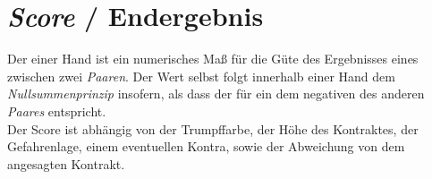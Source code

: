 \section{\textit{Score} / Endergebnis}

\noindent
Der \scy einer Hand ist ein numerisches Maß für die Güte des Ergebnisses eines \bo zwischen zwei \textit{Paaren}.
Der Wert selbst folgt innerhalb einer Hand dem \textit{Nullsummenprinzip} insofern, als dass der \scy für ein
\pa dem negativen \scy des anderen \textit{Paares} entspricht.\\[.1cm]
Der Score ist abhängig von der Trumpffarbe, der Höhe des Kontraktes, der Gefahrenlage, einem eventuellen Kontra, sowie
der Abweichung von dem angesagten Kontrakt.
